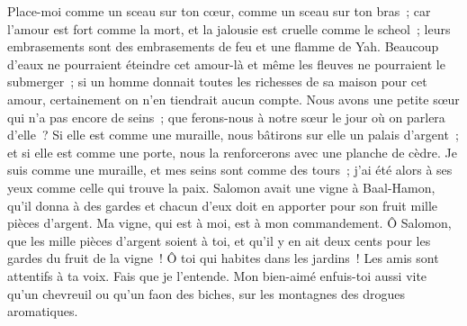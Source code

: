 \begin{multicols}{2}
Place-moi comme un sceau sur ton cœur, comme un sceau sur ton bras~; car l'amour est fort comme la mort, et la jalousie est cruelle comme le scheol~; leurs embrasements sont des embrasements de feu et une flamme de Yah.
 Beaucoup d'eaux ne pourraient éteindre cet amour-là et même les fleuves ne pourraient le submerger~; si un homme donnait toutes les richesses de sa maison pour cet amour, certainement on n'en tiendrait aucun compte.
 Nous avons une petite sœur qui n'a pas encore de seins~; que ferons-nous à notre sœur le jour où on parlera d'elle~?
Si elle est comme une muraille, nous bâtirons sur elle un palais d'argent~; et si elle est comme une porte, nous la renforcerons avec une planche de cèdre.
 Je suis comme une muraille, et mes seins sont comme des tours~; j'ai été alors à ses yeux comme celle qui trouve la paix. 
Salomon avait une vigne à Baal-Hamon, qu'il donna à des gardes et chacun d'eux doit en apporter pour son fruit mille pièces d'argent. 
Ma vigne, qui est à moi, est à mon commandement. Ô Salomon, que les mille pièces d'argent soient à toi, et qu'il y en ait deux cents pour les gardes du fruit de la vigne~!
 Ô toi qui habites dans les jardins~! Les amis sont attentifs à ta voix.  Fais que je l'entende. 
 Mon bien-aimé enfuis-toi aussi vite qu'un chevreuil ou qu'un faon des biches, sur les montagnes des drogues aromatiques. 
\PPE{}
\end{multicols}
